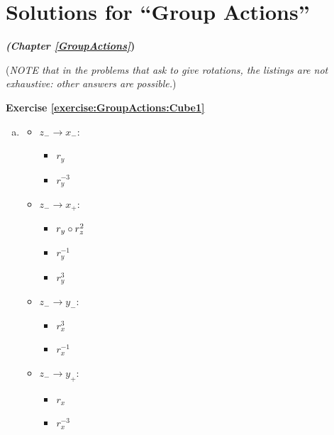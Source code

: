 
\section{Solutions for ``Group Actions''}
\label{sec:AnswerKey:GroupActions}
\noindent\textbf{\textit{ (Chapter \ref{GroupActions}})}\bigskip

\noindent(\emph{NOTE that in the problems that ask to give rotations, the listings are not exhaustive: other answers are possible.})

\noindent\textbf{Exercise \ref{exercise:GroupActions:Cube1}}
\begin{enumerate}[(a)]
\item
	\begin{multicols}{4}
	\begin{itemize}
	\item
	$z_-\rightarrow x_-$: 
		\begin{itemize}
		\item
		$r_y$
		
		\item
		$r_y^{-3} $ 
		\end{itemize}
				
	\item
	$z_-\rightarrow x_+$: 
		\begin{itemize}
		\item
		$r_y\circ r_z^2$
		
		\item
		$r_y^{-1}$
		
		\item
		$r_y^3$
		\end{itemize}
				
	\item
	$z_-\rightarrow y_-$: 
		\begin{itemize}
		\item
		$r_x^3$
		
		\item
		$r_x^{-1}$
		\end{itemize}
				
	\item
	$z_-\rightarrow y_+$:
		\begin{itemize}
		\item
		$r_x$
		
		\item
		$r_x^{-3}$
		\end{itemize}
				
	\end{itemize}
	\end{multicols}
	

\end{enumerate}

